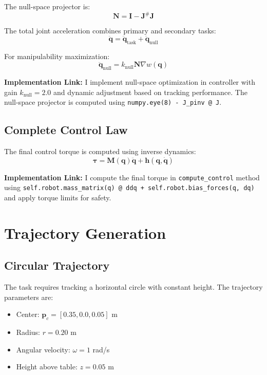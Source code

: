 \documentclass[journal,10pt,twocolumn]{IEEEtran}
\begin{document}
The null-space projector is:
\begin{equation}
\mathbf{N} = \mathbf{I} - \mathbf{J}^\#\mathbf{J}
\end{equation}

The total joint acceleration combines primary and secondary tasks:
\begin{equation}
\ddot{\mathbf{q}} = \ddot{\mathbf{q}}_{\text{task}} + \ddot{\mathbf{q}}_{\text{null}}
\end{equation}

For manipulability maximization:
\begin{equation}
\ddot{\mathbf{q}}_{\text{null}} = k_{\text{null}}\mathbf{N}\nabla w(\mathbf{q})
\end{equation}

\textbf{Implementation Link:} I implement null-space optimization in controller with gain $k_{\text{null}} = 2.0$ and dynamic adjustment based on tracking performance. The null-space projector is computed using \texttt{numpy.eye(8) - J\_pinv @ J}.

\subsection{Complete Control Law}
The final control torque is computed using inverse dynamics:
\begin{equation}
\boldsymbol{\tau} = \mathbf{M}(\mathbf{q})\ddot{\mathbf{q}} + \mathbf{h}(\mathbf{q}, \dot{\mathbf{q}})
\end{equation}

\textbf{Implementation Link:} I compute the final torque in \texttt{compute\_control} method using \texttt{self.robot.mass\_matrix(q) @ ddq + self.robot.bias\_forces(q, dq)} and apply torque limits for safety.

\section{Trajectory Generation}

\subsection{Circular Trajectory}
The task requires tracking a horizontal circle with constant height. The trajectory parameters are:

\begin{itemize}
	\item Center: $\mathbf{p}_c = [0.35, 0.0, 0.05]$ m
	\item Radius: $r = 0.20$ m
	\item Angular velocity: $\omega = 1$ rad/s
	\item Height above table: $z = 0.05$ m
\end{itemize}
\end{document}
